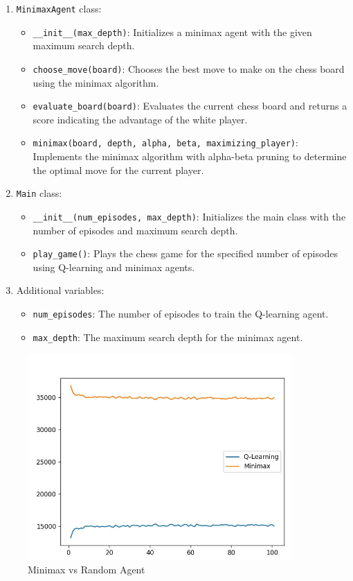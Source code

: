 \documentclass{article}
\begin{document}
\begin{enumerate}
  \item \texttt{MinimaxAgent} class:
    \begin{itemize}
      \item \texttt{\_\_init\_\_(max\_depth)}: Initializes a minimax agent with the given maximum search depth.
      \item \texttt{choose\_move(board)}: Chooses the best move to make on the chess board using the minimax algorithm.
      \item \texttt{evaluate\_board(board)}: Evaluates the current chess board and returns a score indicating the advantage of the white player.
      \item \texttt{minimax(board, depth, alpha, beta, maximizing\_player)}: Implements the minimax algorithm with alpha-beta pruning to determine the optimal move for the current player.
    \end{itemize}
    
  \item \texttt{Main} class:
    \begin{itemize}
      \item \texttt{\_\_init\_\_(num\_episodes, max\_depth)}: Initializes the main class with the number of episodes and maximum search depth.
      \item \texttt{play\_game()}: Plays the chess game for the specified number of episodes using Q-learning and minimax agents.
    \end{itemize}
  
  \item Additional variables:
    \begin{itemize}
      \item \texttt{num\_episodes}: The number of episodes to train the Q-learning agent.
      \item \texttt{max\_depth}: The maximum search depth for the minimax agent.
    \end{itemize}
\end{enumerate}
\begin{figure}[htbp]
    \centering
    \includegraphics[width=0.9\textwidth]{img 4.jpg}
    \caption{Minimax vs Random Agent}
    \label{fig:example}
\end{figure}
\end{document}
